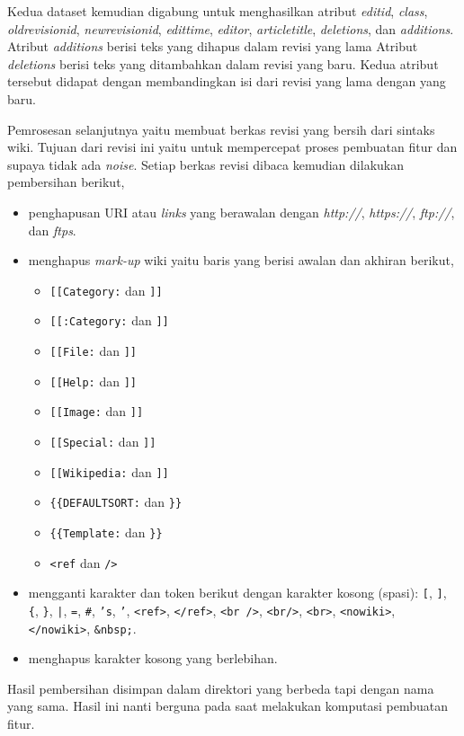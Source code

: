 Kedua dataset kemudian digabung untuk menghasilkan atribut \textit{editid},
\textit{class}, \textit{oldrevisionid}, \textit{newrevisionid},
\textit{edittime}, \textit{editor}, \textit{articletitle}, \textit{deletions},
dan \textit{additions}.
Atribut \textit{additions} berisi teks yang dihapus dalam revisi yang lama
Atribut \textit{deletions} berisi teks yang ditambahkan dalam revisi yang baru.
Kedua atribut tersebut didapat dengan membandingkan isi dari revisi yang lama
dengan yang baru.

Pemrosesan selanjutnya yaitu membuat berkas revisi yang bersih dari sintaks
wiki.
Tujuan dari revisi ini yaitu untuk mempercepat proses pembuatan fitur dan
supaya tidak ada \textit{noise}.
Setiap berkas revisi dibaca kemudian dilakukan pembersihan berikut,

\begin{itemize}
\item penghapusan URI atau \textit{links} yang berawalan dengan
\textit{http://}, \textit{https://}, \textit{ftp://}, dan \textit{ftps}.
\item menghapus \textit{mark-up} wiki yaitu baris yang berisi awalan dan
akhiran berikut,
	\begin{itemize}
	\item \texttt{[[Category:} dan \texttt{]]}
	\item \texttt{[[:Category:} dan \texttt{]]}
	\item \texttt{[[File:} dan \texttt{]]}
	\item \texttt{[[Help:} dan \texttt{]]}
	\item \texttt{[[Image:} dan \texttt{]]}
	\item \texttt{[[Special:} dan \texttt{]]}
	\item \texttt{[[Wikipedia:} dan \texttt{]]}
	\item \texttt{\{\{DEFAULTSORT:} dan \texttt{\}\}}
	\item \texttt{\{\{Template:} dan \texttt{\}\}}
	\item \texttt{<ref} dan \texttt{/>}
	\end{itemize}
\item mengganti karakter dan token berikut dengan karakter kosong (spasi):
\texttt{[}, \texttt{]}, \texttt{\{}, \texttt{\}}, \texttt{|}, \texttt{=},
\texttt{\#}, \texttt{'s}, \texttt{'}, \texttt{<ref>}, \texttt{</ref>},
\texttt{<br />}, \texttt{<br/>}, \texttt{<br>}, \texttt{<nowiki>},
\texttt{</nowiki>}, \texttt{\&nbsp;}.
\item menghapus karakter kosong yang berlebihan.
\end{itemize}

Hasil pembersihan disimpan dalam direktori yang berbeda tapi dengan nama yang
sama.
Hasil ini nanti berguna pada saat melakukan komputasi pembuatan fitur.

